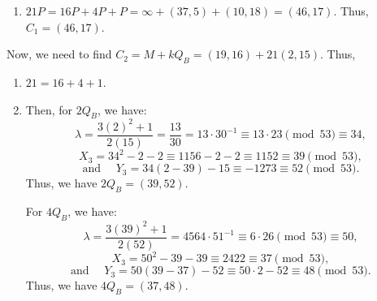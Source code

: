 \documentclass[11pt]{article}
\begin{document}
\begin{enumerate}
\begin{enumerate}
{\begin{enumerate}[label=(\roman*)]
                For \(4P\) \((34,11) + (34,11)\):
                \[
                    \lambda = \frac{3(34)^{2} + 1}{2(11)} = \frac{3469}{22} = 3469 \cdot 22^{-1} \equiv 3469 \cdot 41 \pmod{53} \equiv 30
                \]
                \[
                    X_{3} = 30^{2} - 34 - 34 \equiv 900 - 34 - 34 \equiv 832 \equiv 37 \pmod{53},
                \]
                \[
                    \text{and }\quad Y_{3} = 30(34 - 37) - 11 \equiv 30 \cdot (-3) - 11 \equiv -101 \equiv 5 \pmod{53}.
                \]
                Thus, we have \((37,5)\) for \(4P\).

                For \(8P\) \((37,5) + (37,5)\):
                \[
                    \lambda = \frac{3(37)^{2} + 1}{2(5)} = \frac{4108}{10} = 4108 \cdot 10^{-1} \equiv 4108 \cdot 16 \pmod{53} \equiv 8,
                \]
                \[
                    X_{3} = 8^{2} - 37 - 37 \equiv 64 - 37 - 37 \equiv 43 \pmod{53},
                \]
                \[
                    \text{and }\quad Y_{3} = 8(37 - 43) - 5 \equiv 8 \cdot (-6) - 5 \equiv -53 \equiv 0 \pmod{53}.
                \]
                Thus, we have \((43,0)\) for \(8P\).

                Since we have \((X,0)\), \(16P = \mathcal{O}\). Hence, \(16P = \infty\).
                \item \(21P = 16P + 4P + P = \infty + (37,5) + (10,18) = (46,17)\). Thus, \(C_{1} = (46,17)\). 
            \end{enumerate}
            Now, we need to find \(C_{2} = M + kQ_{B} = (19,16) + 21(2,15)\). Thus,
            \begin{enumerate}[label=(\roman*)]
                \item \(21 = 16 + 4 + 1\).
                \item Then, for \(2Q_{B}\), we have:
                \[
                    \lambda = \frac{3(2)^{2} + 1}{2(15)} = \frac{13}{30} = 13 \cdot 30^{-1} \equiv 13 \cdot 23 \pmod{53} \equiv 34,
                \]
                \[
                    X_{3} = 34^{2} - 2 - 2 \equiv 1156 - 2 - 2 \equiv 1152 \equiv 39 \pmod{53},
                \]
                \[
                    \text{and }\quad Y_{3} = 34(2 - 39) - 15 \equiv -1273 \equiv 52 \pmod{53}.
                \]
                Thus, we have \(2Q_{B} = (39,52)\).

                For \(4Q_{B}\), we have:
                \[
                    \lambda = \frac{3(39)^{2} + 1}{2(52)} = 4564 \cdot 51^{-1} \equiv 6 \cdot 26 \pmod{53} \equiv 50,
                \]
                \[
                    X_{3} = 50^{2} - 39 - 39 \equiv 2422 \equiv 37 \pmod{53},
                \]
                \[
                    \text{and }\quad Y_{3} = 50(39 - 37) - 52 \equiv 50 \cdot 2 - 52 \equiv 48 \pmod{53}.
                \]
                Thus, we have \(4Q_{B} = (37,48)\).


\end{enumerate}}
\end{enumerate}
\end{enumerate}
\end{document}
